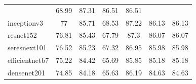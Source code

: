 \begin{table}[H]
\begin{tabular}{lcccccc}
                                            & 68.99              & 87.31 &
        86.51                               & 86.51
        \\
        inceptionv3                         & 77                 & 85.71
                                            & 68.53              & 87.22 &
        86.13                               & 86.13
        \\
        resnet152                           & 76.81              & 85.43
                                            & 67.79              & 87.3  &
        86.07                               & 86.07
        \\
        seresnext101                        & 76.52              & 85.23
                                            & 67.32              & 86.95 &
        85.98                               & 85.98
        \\
        efficientnetb7                      & 75.22              & 84.42
                                            & 65.69              & 85.85 &
        85.18                               & 85.18
        \\
        densenet201                         & 74.85              & 84.18
                                            & 65.63              & 86.19 &
        84.63                               & 84.63
        \\ \bottomrule
    \end{tabular}%

\end{table}